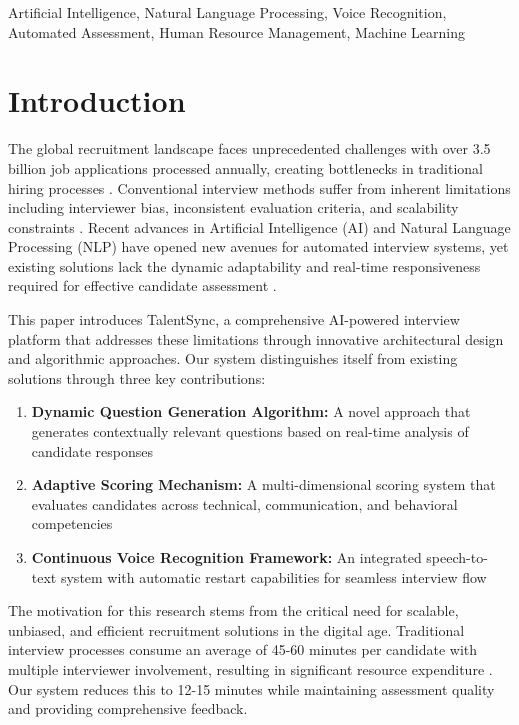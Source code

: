 \documentclass[conference]{IEEEtran}
\begin{document}
\begin{IEEEkeywords}
Artificial Intelligence, Natural Language Processing, Voice Recognition, Automated Assessment, Human Resource Management, Machine Learning
\end{IEEEkeywords}

\section{Introduction}

The global recruitment landscape faces unprecedented challenges with over 3.5 billion job applications processed annually, creating bottlenecks in traditional hiring processes \cite{linkedin2023}. Conventional interview methods suffer from inherent limitations including interviewer bias, inconsistent evaluation criteria, and scalability constraints \cite{smith2023bias}. Recent advances in Artificial Intelligence (AI) and Natural Language Processing (NLP) have opened new avenues for automated interview systems, yet existing solutions lack the dynamic adaptability and real-time responsiveness required for effective candidate assessment \cite{chen2023ai}.

This paper introduces TalentSync, a comprehensive AI-powered interview platform that addresses these limitations through innovative architectural design and algorithmic approaches. Our system distinguishes itself from existing solutions through three key contributions:

\begin{enumerate}
\item \textbf{Dynamic Question Generation Algorithm:} A novel approach that generates contextually relevant questions based on real-time analysis of candidate responses
\item \textbf{Adaptive Scoring Mechanism:} A multi-dimensional scoring system that evaluates candidates across technical, communication, and behavioral competencies
\item \textbf{Continuous Voice Recognition Framework:} An integrated speech-to-text system with automatic restart capabilities for seamless interview flow
\end{enumerate}

The motivation for this research stems from the critical need for scalable, unbiased, and efficient recruitment solutions in the digital age. Traditional interview processes consume an average of 45-60 minutes per candidate with multiple interviewer involvement, resulting in significant resource expenditure \cite{shrm2023}. Our system reduces this to 12-15 minutes while maintaining assessment quality and providing comprehensive feedback.
\end{document}
